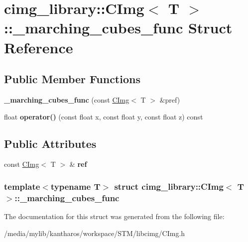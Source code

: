 \hypertarget{structcimg__library_1_1_c_img_1_1__marching__cubes__func}{
\section{cimg\_\-library::CImg$<$ T $>$::\_\-marching\_\-cubes\_\-func Struct Reference}
\label{structcimg__library_1_1_c_img_1_1__marching__cubes__func}
}
\subsection*{Public Member Functions}
\begin{DoxyCompactItemize}
\item 
\hypertarget{structcimg__library_1_1_c_img_1_1__marching__cubes__func_a05e6c243197d28197fcf521051a67bae}{
{\bfseries \_\-marching\_\-cubes\_\-func} (const \hyperlink{structcimg__library_1_1_c_img}{CImg}$<$ T $>$ \&pref)}
\label{structcimg__library_1_1_c_img_1_1__marching__cubes__func_a05e6c243197d28197fcf521051a67bae}

\item 
\hypertarget{structcimg__library_1_1_c_img_1_1__marching__cubes__func_a16c03f6021a7f77a6226734a009b45ac}{
float {\bfseries operator()} (const float x, const float y, const float z) const }
\label{structcimg__library_1_1_c_img_1_1__marching__cubes__func_a16c03f6021a7f77a6226734a009b45ac}

\end{DoxyCompactItemize}
\subsection*{Public Attributes}
\begin{DoxyCompactItemize}
\item 
\hypertarget{structcimg__library_1_1_c_img_1_1__marching__cubes__func_a531d40c3d3951d48d1b2c62931722569}{
const \hyperlink{structcimg__library_1_1_c_img}{CImg}$<$ T $>$ \& {\bfseries ref}}
\label{structcimg__library_1_1_c_img_1_1__marching__cubes__func_a531d40c3d3951d48d1b2c62931722569}

\end{DoxyCompactItemize}
\subsubsection*{template$<$typename T$>$ struct cimg\_\-library::CImg$<$ T $>$::\_\-marching\_\-cubes\_\-func}



The documentation for this struct was generated from the following file:\begin{DoxyCompactItemize}
\item 
/media/mylib/kantharos/workspace/STM/libcimg/CImg.h\end{DoxyCompactItemize}
